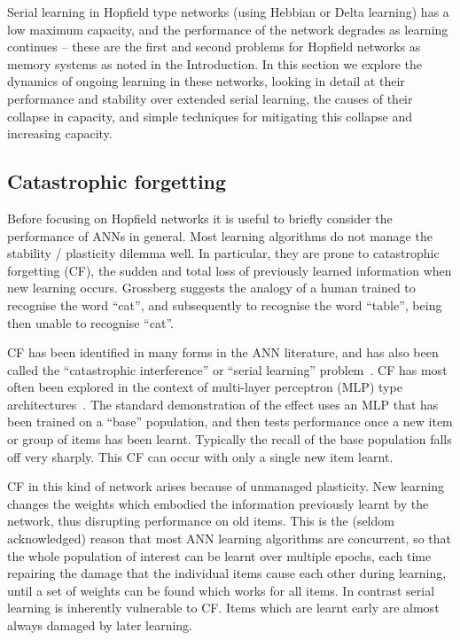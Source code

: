 Serial learning in Hopfield type networks (using Hebbian or Delta learning) has a low maximum capacity, and the performance of the network degrades as learning continues -- these are the first and second problems for Hopfield networks as memory systems as noted in the Introduction.  In this section we explore the dynamics of ongoing learning in these networks, looking in detail at their performance and stability over extended serial learning, the causes of their collapse in capacity, and simple techniques for mitigating this collapse and increasing capacity.

\subsection{Catastrophic forgetting}  %
\label{sec:CF}

Before focusing on Hopfield networks it is useful to briefly consider the performance of ANNs in general. Most learning algorithms do not manage the stability / plasticity dilemma well.  In particular, they are prone to catastrophic forgetting (CF), the sudden and total loss of previously learned information when new learning occurs.  Grossberg suggests the analogy of a human trained to recognise the word ``cat'', and subsequently to recognise the word ``table'', being then unable to recognise ``cat''.  

CF has been identified in many forms in the ANN literature, and has also been called the ``catastrophic interference'' or ``serial learning'' problem~\citep{Hetherington89, McCloskey1989, Lewandowsky91, French1992, McRae1993, Sharkey1995, Robins1995, French1999, Ans2002, Robins2004}.  CF has most often been explored in the context of multi-layer perceptron (MLP) type architectures~\citep{McCloskey1989, Hetherington89, Ratcliff90, Lewandowsky91, Murre1992, French1992, French1994, French1997, McRae1993, Lewandowsky1995, Sharkey1995, Robins1995, Robins1996, Frean99}. The standard demonstration of the effect uses an MLP that has been trained on a ``base'' population, and then tests performance once a new item or group of items has been learnt.  Typically the recall of the base population falls off very sharply.  This CF can occur with only a single new item learnt.

CF in this kind of network arises because of unmanaged plasticity.  New learning changes the weights which embodied the information previously learnt by the network, thus disrupting performance on old items.  This is the (seldom acknowledged) reason that most ANN learning algorithms are concurrent, so that the whole population of interest can be learnt over multiple epochs, each time repairing the damage that the individual items cause each other during learning, until a set of weights can be found which works for all items.  In contrast serial learning is inherently vulnerable to CF.  Items which are learnt early are almost always damaged by later learning.  


